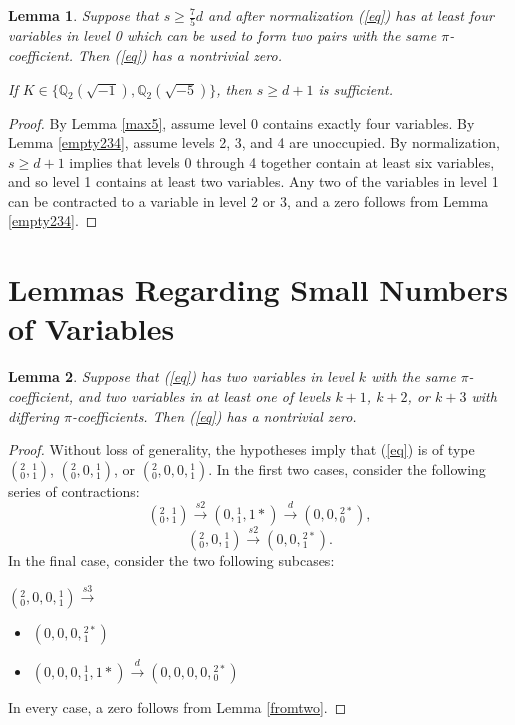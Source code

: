 \documentclass[12pt]{amsart}
\newtheorem{lemma}{Lemma}
\begin{document}
\begin{lemma} \label{max4}
Suppose that $s \ge \frac{7}{5}d$ and after normalization (\ref{eq}) has at least four variables in level 0 which can be used to form two pairs with the same $\pi$-coefficient.  Then (\ref{eq}) has a nontrivial zero.  

If $K \in \{\mathbb{Q}_2(\sqrt{-1}), \mathbb{Q}_2(\sqrt{-5})\}$, then $s \ge d + 1$ is sufficient.
\end{lemma}
\begin{proof}
By Lemma \ref{max5}, assume level 0 contains exactly four variables.  By Lemma \ref{empty234}, assume levels 2, 3, and 4 are unoccupied. By normalization, $s \ge d + 1$ implies that levels 0 through 4 together contain at least six variables, and so level 1 contains at least two variables.  Any two of the variables in level 1 can be contracted to a variable in level 2 or 3, and a zero follows from Lemma \ref{empty234}.
\end{proof}

\section{Lemmas Regarding Small Numbers of Variables}

\begin{lemma}\label{2same2diff}
Suppose that (\ref{eq}) has two variables in level $k$ with the same $\pi$-coefficient, and two variables in at least one of levels $k+1$, $k+2$, or $k+3$ with differing $\pi$-coefficients.  Then (\ref{eq}) has a nontrivial zero.
\end{lemma}
\begin{proof}
Without loss of generality, the hypotheses imply that (\ref{eq}) is of type $({}^{2}_{0}, {}^{1}_{1})$, $({}^{2}_{0}, 0, {}^{1}_{1})$, or $({}^{2}_{0}, 0, 0, {}^{1}_{1})$.  In the first two cases, consider the following series of contractions:
$$({}^{2}_{0}, {}^{1}_{1}) \xrightarrow{s2} (0, {}^{1}_{1}, 1*) \xrightarrow{d} (0, 0, {}^{2*}_{0}),$$
$$({}^{2}_{0}, 0, {}^{1}_{1}) \xrightarrow{s2} (0, 0, {}^{2*}_{1}).$$
In the final case, consider the two following subcases:
\item $({}^{2}_{0}, 0, 0, {}^{1}_{1}) \xrightarrow{s3}$
\begin{itemize}
    \item $(0, 0, 0, {}^{2*}_{1})$
    \item $(0, 0, 0, {}^{1}_{1}, 1*) \xrightarrow{d} (0, 0, 0, 0, {}^{2*}_{0})$
\end{itemize}
In every case, a zero follows from Lemma \ref{fromtwo}.
\end{proof}
\end{document}
